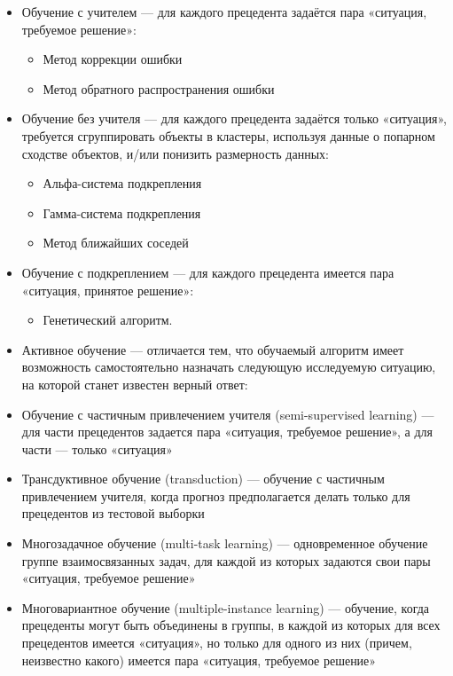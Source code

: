 \begin{itemize}
    \item Обучение с учителем — для каждого прецедента задаётся пара «ситуация, требуемое решение»:
    \begin{itemize}
    \item Метод коррекции ошибки
    \item Метод обратного распространения ошибки
    \end{itemize}
    \item Обучение без учителя — для каждого прецедента задаётся только «ситуация», требуется сгруппировать объекты в кластеры, используя данные о попарном сходстве объектов, и/или понизить размерность данных:
    \begin{itemize}
    \item Альфа-система подкрепления
    \item Гамма-система подкрепления
    \item Метод ближайших соседей
    \end{itemize}
    \item Обучение с подкреплением — для каждого прецедента имеется пара «ситуация, принятое решение»:
    \begin{itemize}
    \item Генетический алгоритм.
    \end{itemize}
    \item Активное обучение — отличается тем, что обучаемый алгоритм имеет возможность самостоятельно назначать следующую исследуемую ситуацию, на которой станет известен верный ответ:
    \item Обучение с частичным привлечением учителя (semi-supervised learning) — для части прецедентов задается пара «ситуация, требуемое решение», а для части — только «ситуация»
    \item Трансдуктивное обучение (transduction) — обучение с частичным привлечением учителя, когда прогноз предполагается делать только для прецедентов из тестовой выборки
    \item Многозадачное обучение (multi-task learning) — одновременное обучение группе взаимосвязанных задач, для каждой из которых задаются свои пары «ситуация, требуемое решение»
    \item Многовариантное обучение (multiple-instance learning) — обучение, когда прецеденты могут быть объединены в группы, в каждой из которых для всех прецедентов имеется «ситуация», но только для одного из них (причем, неизвестно какого) имеется пара «ситуация, требуемое решение»

\end{itemize}


